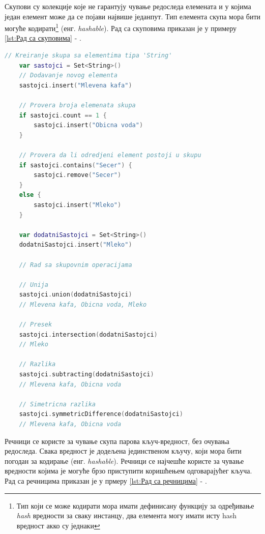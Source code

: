 \documentclass[12pt,oneside]{memoir}
\begin{document}
\indent Скупови су колекције које не гарантују чување редоследа елемената и у којима један елемент може да се појави највише једанпут. Тип елемента скупа мора бити могуће кодирати\footnote{Тип који се може кодирати мора имати дефинисану функцију за одређивање \textit{hash} вредности за сваку инстанцу, два елемента могу имати исту hash вредност акко су једнаки} (енг. \textit{hashable}). Рад са скуповима приказан је у примеру \ref{lst:Рад са скуповима} - .

\begin{lstlisting}[caption=\textit{{Рад са скуповима}}, label={lst:Рад са скуповима}, language=Swift, frame=single]
    // Kreiranje skupa sa elementima tipa 'String'
    var sastojci = Set<String>()
    // Dodavanje novog elementa
    sastojci.insert("Mlevena kafa")
    
    // Provera broja elemenata skupa
    if sastojci.count == 1 {
        sastojci.insert("Obicna voda")
    }
    
    // Provera da li odredjeni element postoji u skupu
    if sastojci.contains("Secer") {
        sastojci.remove("Secer")
    }
    else {
        sastojci.insert("Mleko")
    }
    
    var dodatniSastojci = Set<String>()
    dodatniSastojci.insert("Mleko")
    
    // Rad sa skupovnim operacijama
    
    // Unija
    sastojci.union(dodatniSastojci)
    // Mlevena kafa, Obicna voda, Mleko
    
    // Presek
    sastojci.intersection(dodatniSastojci)
    // Mleko
    
    // Razlika
    sastojci.subtracting(dodatniSastojci)
    // Mlevena kafa, Obicna voda
    
    // Simetricna razlika
    sastojci.symmetricDifference(dodatniSastojci)
    // Mlevena kafa, Obicna voda
\end{lstlisting}

\indent Речници се користе за чување скупа парова кључ-вредност, без очувања редоследа. Свака вредност је додељена јединственом кључу, који мора бити погодан за кодирање (енг. \textit{hashable}). Речници се најчешће користе за чување вредности којима је могуће брзо приступити коришћењем одговарајућег кључа. Рад са речницима приказан је у прмеру \ref{lst:Рад са речницима} - .
\end{document}
